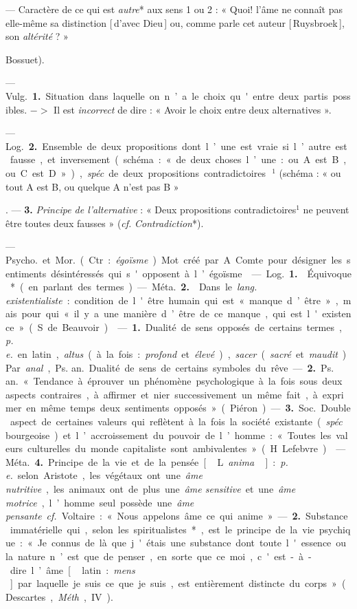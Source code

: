 \begin{itemize}[leftmargin=1cm, label=, itemsep=1pt]
{ — Caractère de ce qui est
{\it autre}* aux sens 1 ou 2 : « Quoi!
l'âme ne connaît pas elle-même sa
distinction [\,d'avec Dieu\,] ou, comme
parle cet auteur [\,Ruysbroek\,], son
{\it altérité} ? » {Bossuet).

 — \si{Vulg.} {\bf 1.} Situation
dans laquelle on n’a le choix qu'entre
deux partis possibles. $->$ Il est
{\it incorrect} de dire : « Avoir le choix
entre deux alternatives ».

— \si{Log.} {\bf 2.} Ensemble de deux
propositions dont l’une est vraie si
l’autre est fausse, et inversement
(schéma : « de deux choses l’une :
ou A est B, ou C est D »), {\it spéc}. de
deux propositions contradictoires\,$^1$
(schéma : « ou tout A est B, ou
quelque A n’est pas B »}. — {\bf 3.} {\it Principe de l'alternative} : « Deux propositions contradictoires$^1$ ne peuvent
être toutes deux fausses » ({\it cf.}  {\it Contradiction}*).

 — \si{Psycho.} et \si{Mor.} (Ctr. :
{\it égoïsme}). Mot créé par A. Comte
pour désigner les sentiments désintéressés qui s'opposent à l’égoïsme.

 — \si{Log.} {\bf 1.}  Équivoque* (en
parlant des termes).

— \si{Méta.} {\bf 2.}  Dans le {\it lang. existentialiste} : condition de l'être humain
qui est « manque d’être », mais pour
qui « il y a une manière d’être de
ce manque, qui est l'existence »
(S. de Beauvoir).

 — {\bf 1.} Dualité de sens
opposés de certains termes, {\it p. e.} en
latin, {\it altus} (à la fois : {\it profond} et
{\it élevé}), {\it sacer} ({\it sacré} et {\it maudit}). Par
{\it anal}., \si{Ps. an.} Dualité de sens de
certains symboles du rêve.

— {\bf 2.} \si{Ps. an.} « Tendance à
éprouver un phénomène psychologique à la fois sous deux aspects
contraires, à affirmer et nier successivement un même fait, à exprimer en
même temps deux sentiments opposés » (Piéron.)

— {\bf 3.} \si{Soc.} Double aspect de
certaines valeurs qui reflètent à la
fois la société existante ({\it spéc}. bourgeoise) et l’accroissement du pouvoir
de l’homme : « Toutes les valeurs
culturelles du monde capitaliste sont
ambivalentes » (H. Lefebvre).

 — \si{Méta.} {\bf 4.} Principe de la vie et
de la pensée [\,L. {\it anima}\,] : {\it p. e.} selon
Aristote, les végétaux ont une {\it âme
nutritive}, les animaux ont de plus
une {\it âme sensitive} et une {\it âme motrice},
l’homme seul possède une {\it âme pensante}. {\it cf.}  Voltaire : « Nous appelons
âme ce qui anime ». — {\bf 2.} Substance
immatérielle qui, selon les spiritualistes*,
est le principe de la vie psychique : « Je connus de là que j'étais une
substance dont toute l'essence ou la
nature n’est que de penser..., en sorte
que ce moi, c'est-à-dire l’âme [\,latin :
{\it mens}\,] par laquelle je suis ce que
je suis, est entièrement distincte du
corps » (Descartes, {\it Méth}., IV).

}
\end{itemize}
